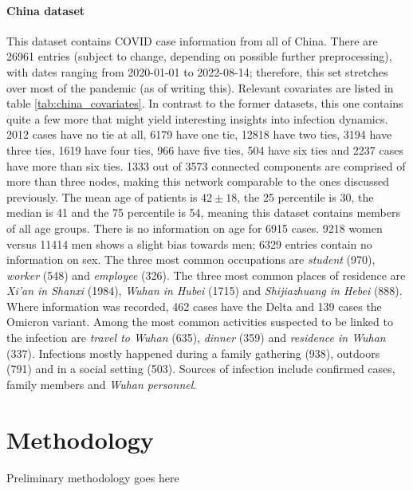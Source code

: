 \documentclass{article}
\begin{document}
	\paragraph{China dataset} This dataset contains COVID case information from all of China. There are 26961 entries (subject to change, depending on possible further preprocessing), with dates ranging from 2020-01-01 to 2022-08-14; therefore, this set stretches over most of the pandemic (as of writing this). Relevant covariates are listed in table \ref{tab:china_covariates}. In contrast to the former datasets, this one contains quite a few more that might yield interesting insights into infection dynamics. 2012 cases have no tie at all, 6179 have one tie, 12818 have two ties, 3194 have three ties, 1619 have four ties, 966 have five ties, 504 have six ties and 2237 cases have more than six ties. 1333 out of 3573 connected components are comprised of more than three nodes, making this network comparable to the ones discussed previously. The mean age of patients is $42\pm18$, the 25 percentile is 30, the median is 41 and the 75 percentile is 54, meaning this dataset contains members of all age groups. There is no information on age for 6915 cases. 9218 women versus 11414 men shows a slight bias towards men; 6329 entries contain no information on sex. The three most common occupations are \emph{student} (970), \emph{worker} (548) and \emph{employee} (326). The three most common places of residence are \emph{Xi'an in Shanxi} (1984), \emph{Wuhan in Hubei} (1715) and \emph{Shijiazhuang in Hebei} (888). Where information was recorded, 462 cases have the Delta and 139 cases the Omicron variant. Among the most common activities suspected to be linked to the infection are \emph{travel to Wuhan} (635), \emph{dinner} (359) and \emph{residence in Wuhan} (337). Infections mostly happened during a family gathering (938), outdoors (791) and in a social setting (503). Sources of infection include confirmed cases, family members and \emph{Wuhan personnel}.
	
	\section{Methodology}
	Preliminary methodology goes here
\end{document}
